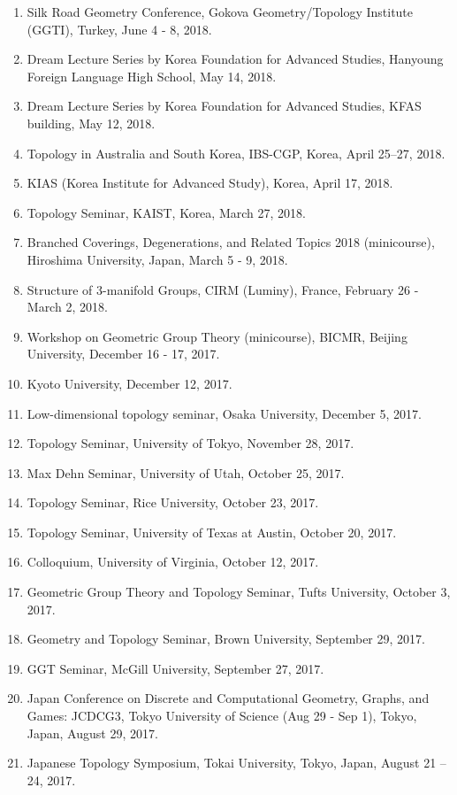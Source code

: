 \documentclass[11pt,a4paper]{article}
\begin{document}
\begin{enumerate}[leftmargin=1.5em, label=\arabic*.]
\item Silk Road Geometry Conference, Gokova Geometry/Topology Institute (GGTI), Turkey, June 4 - 8, 2018.
\item Dream Lecture Series by Korea Foundation for Advanced Studies, Hanyoung Foreign Language High School, May 14, 2018.
\item Dream Lecture Series by Korea Foundation for Advanced Studies, KFAS building, May 12, 2018.
\item Topology in Australia and South Korea, IBS-CGP, Korea, April 25--27, 2018.
\item KIAS (Korea Institute for Advanced Study), Korea, April 17, 2018.
\item Topology Seminar, KAIST, Korea, March 27, 2018.
\item Branched Coverings, Degenerations, and Related Topics 2018 (minicourse), Hiroshima University, Japan, March 5 - 9, 2018.
\item Structure of 3-manifold Groups, CIRM (Luminy), France, February 26 - March 2, 2018.
\item Workshop on Geometric Group Theory (minicourse), BICMR, Beijing University, December 16 - 17, 2017.
\item Kyoto University, December 12, 2017.
\item Low-dimensional topology seminar, Osaka University, December 5, 2017.
\item Topology Seminar, University of Tokyo, November 28, 2017.
\item Max Dehn Seminar, University of Utah, October 25, 2017.
\item Topology Seminar, Rice University, October 23, 2017.
\item Topology Seminar, University of Texas at Austin, October 20, 2017.
\item Colloquium, University of Virginia, October 12, 2017.
\item Geometric Group Theory and Topology Seminar, Tufts University, October 3, 2017.
\item Geometry and Topology Seminar, Brown University, September 29, 2017.
\item GGT Seminar, McGill University, September 27, 2017.
\item Japan Conference on Discrete and Computational Geometry, Graphs, and Games: JCDCG3, Tokyo University of Science (Aug 29 - Sep 1), Tokyo, Japan, August 29, 2017.
\item Japanese Topology Symposium, Tokai University, Tokyo, Japan, August 21 -- 24, 2017.

\end{enumerate}
\end{document}
